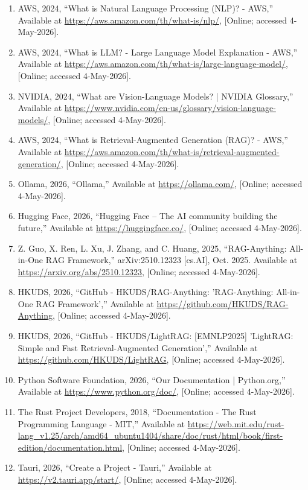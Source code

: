 \documentclass[12pt,oneside,openright,a4paper]{cpe-english-project}
\begin{document}
\begin{enumerate}[label=\arabic*.,leftmargin=0.6in]
\item AWS, 2024, ``What is Natural Language Processing (NLP)? - AWS,'' Available at \url{https://aws.amazon.com/th/what-is/nlp/}, [Online; accessed 4-May-2026].
\item AWS, 2024, ``What is LLM? - Large Language Model Explanation - AWS,'' Available at \url{https://aws.amazon.com/th/what-is/large-language-model/}, [Online; accessed 4-May-2026].
\item NVIDIA, 2024, ``What are Vision-Language Models? | NVIDIA Glossary,'' Available at \url{https://www.nvidia.com/en-us/glossary/vision-language-models/}, [Online; accessed 4-May-2026].
\item AWS, 2024, ``What is Retrieval-Augmented Generation (RAG)? - AWS,'' Available at \url{https://aws.amazon.com/th/what-is/retrieval-augmented-generation/}, [Online; accessed 4-May-2026].
\item Ollama, 2026, ``Ollama,'' Available at \url{https://ollama.com/}, [Online; accessed 4-May-2026].
\item Hugging Face, 2026, ``Hugging Face -- The AI community building the future,'' Available at \url{https://huggingface.co/}, [Online; accessed 4-May-2026].
\item Z. Guo, X. Ren, L. Xu, J. Zhang, and C. Huang, 2025, ``RAG-Anything: All-in-One RAG Framework,'' arXiv:2510.12323 [cs.AI], Oct. 2025. Available at \url{https://arxiv.org/abs/2510.12323}, [Online; accessed 4-May-2026].
\item HKUDS, 2026, ``GitHub - HKUDS/RAG-Anything: 'RAG-Anything: All-in-One RAG Framework','' Available at \url{https://github.com/HKUDS/RAG-Anything}, [Online; accessed 4-May-2026].
\item HKUDS, 2026, ``GitHub - HKUDS/LightRAG: [EMNLP2025] 'LightRAG: Simple and Fast Retrieval-Augmented Generation','' Available at \url{https://github.com/HKUDS/LightRAG}, [Online; accessed 4-May-2026].
\item Python Software Foundation, 2026, ``Our Documentation | Python.org,'' Available at \url{https://www.python.org/doc/}, [Online; accessed 4-May-2026].
\item The Rust Project Developers, 2018, ``Documentation - The Rust Programming Language - MIT,'' Available at \url{https://web.mit.edu/rust-lang_v1.25/arch/amd64_ubuntu1404/share/doc/rust/html/book/first-edition/documentation.html}, [Online; accessed 4-May-2026].
\item Tauri, 2026, ``Create a Project - Tauri,'' Available at \url{https://v2.tauri.app/start/}, [Online; accessed 4-May-2026].

\end{enumerate}
\end{document}
